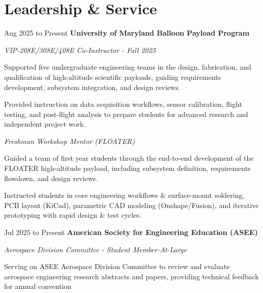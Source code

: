 \section{Leadership \& Service}
	\begin{twocolentry}{Aug 2025 to Present}
        \textbf{University of Maryland Balloon Payload Program}
    \end{twocolentry}
	\textit{VIP-208E/308E/408E Co-Instructor - Fall 2025}
	\vspace{0.10 cm}
	\begin{onecolentry}
	    \begin{highlights}
	        \item Supported five undergraduate engineering teams in the design, fabrication, and qualification of high-altitude scientific payloads, guiding requirements development, subsystem integration, and design reviews.
	        \item Provided instruction on data acquisition workflows, sensor calibration, flight testing, and post-flight analysis to prepare students for advanced research and independent project work.
	    \end{highlights}           
	\end{onecolentry}
    \vspace{0.10 cm}
	\textit{Freshman Workshop Mentor (FLOATER)}
	\vspace{0.10 cm}
	\begin{onecolentry}
	    \begin{highlights}
	        \item Guided a team of first year students through the end-to-end development of the FLOATER high-altitude payload, including subsystem definition, requirements flowdown, and design reviews.
	        \item Instructed students in core engineering workflows \& surface-mount soldering, PCB layout (KiCad), parametric CAD modeling (Onshape/Fusion), and iterative prototyping with rapid design \& test cycles.
	    \end{highlights}           
	\end{onecolentry}

    \vspace{0.20 cm}
    
	\begin{twocolentry}{Jul 2025 to Present}
        \textbf{American Society for Engineering Education (ASEE)}
    \end{twocolentry}
    \textit{Aerospace Division Committee - Student Member-At-Large}
    \vspace{0.10 cm}
    \begin{onecolentry}
        \begin{highlights}
        	\item Serving on ASEE Aerospace Division Committee to review and evaluate aerospace engineering research abstracts and papers, providing technical feedback for annual convention
        \end{highlights}           
    \end{onecolentry}

